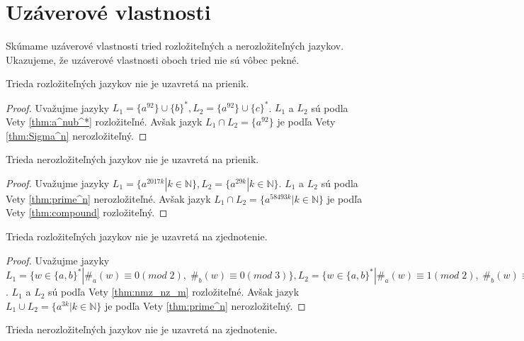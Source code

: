 \section{Uzáverové vlastnosti}

Skúmame uzáverové vlastnosti tried rozložiteľných a nerozložiteľných jazykov. Ukazujeme, že uzáverové vlastnosti oboch tried nie sú vôbec pekné.

\begin{theorem}
Trieda rozložiteľných jazykov nie je uzavretá na prienik.
\end{theorem}

\begin{proof}
Uvažujme jazyky $ L_1 = \lbrace a^{92} \rbrace \cup \lbrace b \rbrace^*, L_2 = \lbrace a^{92} \rbrace \cup \lbrace c \rbrace^* $. $ L_1 $ a $ L_2 $ sú podla Vety \ref{thm:a^nub^*} rozložiteľné. Avšak jazyk $ L_1 \cap L_2 = \lbrace a^{92} \rbrace $ je podľa Vety \ref{thm:Sigma^n} nerozložiteľný.
\end{proof}

\begin{theorem}
Trieda nerozložiteľných jazykov nie je uzavretá na prienik.
\end{theorem}

\begin{proof}
Uvažujme jazyky $ L_1 = \lbrace a^{2017k} | k \in \mathbb{N} \rbrace, L_2 = \lbrace a^{29k} | k \in \mathbb{N} \rbrace $. $ L_1 $ a $ L_2 $ sú podla Vety \ref{thm:prime^n} nerozložiteľné. Avšak jazyk $ L_1 \cap L_2 = \lbrace a^{58493k} | k \in \mathbb{N} \rbrace $ je podľa Vety \ref{thm:compound} rozložiteľný.
\end{proof}

\begin{theorem}
Trieda rozložiteľných jazykov nie je uzavretá na zjednotenie.
\end{theorem}

\begin{proof}
Uvažujme jazyky $ L_1 = \lbrace w \in \lbrace a,b \rbrace^* | \#_a(w) \equiv 0 (mod \; 2), \; \#_b(w) \equiv 0 (mod \; 3) \rbrace, L_2 = \lbrace w \in \lbrace a,b \rbrace^* | \#_a(w) \equiv 1 (mod \; 2), \; \#_b(w) \equiv 0 (mod \; 3) \rbrace $. $ L_1 $ a $ L_2 $ sú podľa Vety \ref{thm:nmz_nz_m} rozložiteľné. Avšak jazyk $ L_1 \cup L_2 = \lbrace a^{3k} | k \in \mathbb{N} \rbrace $ je podľa Vety \ref{thm:prime^n} nerozložiteľný.
\end{proof}

\begin{theorem}
Trieda nerozložiteľných jazykov nie je uzavretá na zjednotenie.
\end{theorem}

